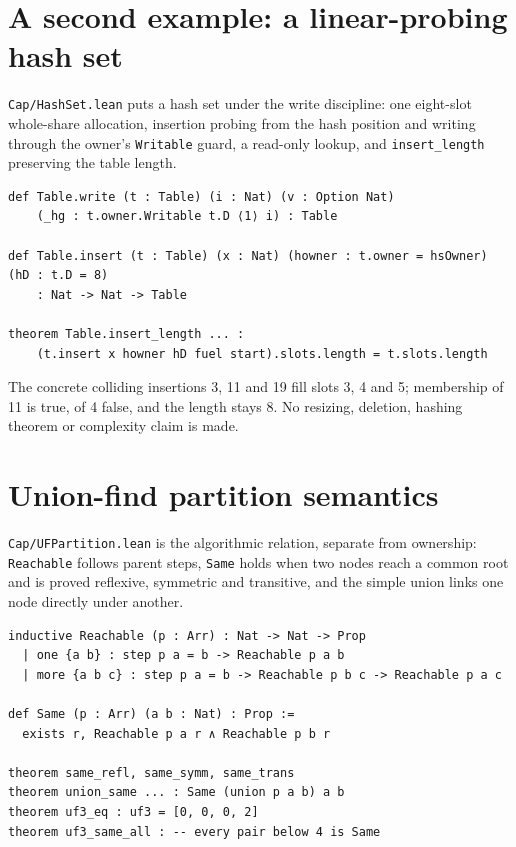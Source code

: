 \documentclass[10pt,a4paper]{article}
\newcommand{\file}[1]{\texttt{\small #1}}
\begin{document}
\section{A second example: a linear-probing hash set}

\file{Cap/HashSet.lean} puts a hash set under the write discipline: one eight-slot
whole-share allocation, insertion probing from the hash position and writing
through the owner's \texttt{Writable} guard, a read-only lookup, and
\texttt{insert\_length} preserving the table length.

\begin{lstlisting}[caption={\file{Cap/HashSet.lean}.}]
def Table.write (t : Table) (i : Nat) (v : Option Nat)
    (_hg : t.owner.Writable t.D ⟨1⟩ i) : Table

def Table.insert (t : Table) (x : Nat) (howner : t.owner = hsOwner) (hD : t.D = 8)
    : Nat -> Nat -> Table

theorem Table.insert_length ... :
    (t.insert x howner hD fuel start).slots.length = t.slots.length
\end{lstlisting}

The concrete colliding insertions 3, 11 and 19 fill slots 3, 4 and 5; membership
of 11 is true, of 4 false, and the length stays 8. No resizing, deletion, hashing
theorem or complexity claim is made.

\section{Union-find partition semantics}

\file{Cap/UFPartition.lean} is the algorithmic relation, separate from ownership:
\texttt{Reachable} follows parent steps, \texttt{Same} holds when two nodes reach
a common root and is proved reflexive, symmetric and transitive, and the simple
union links one node directly under another.

\begin{lstlisting}[caption={\file{Cap/UFPartition.lean}.}]
inductive Reachable (p : Arr) : Nat -> Nat -> Prop
  | one {a b} : step p a = b -> Reachable p a b
  | more {a b c} : step p a = b -> Reachable p b c -> Reachable p a c

def Same (p : Arr) (a b : Nat) : Prop :=
  exists r, Reachable p a r ∧ Reachable p b r

theorem same_refl, same_symm, same_trans
theorem union_same ... : Same (union p a b) a b
theorem uf3_eq : uf3 = [0, 0, 0, 2]
theorem uf3_same_all : -- every pair below 4 is Same
\end{lstlisting}
\end{document}
